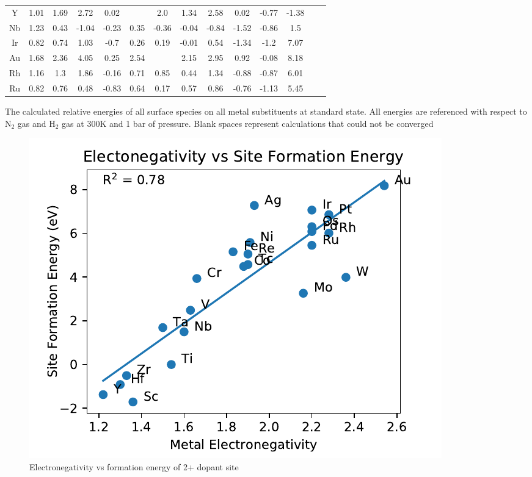 \begin{center}
\begin{tabular}{| c | c | c | c | c | c | c | c | c | c | c | c | c | c |}
Y & 1.01 & 1.69 & 2.72 & 0.02 &  & 2.0 & 1.34 & 2.58 & 0.02 & -0.77 & -1.38 \\
Nb & 1.23 & 0.43 & -1.04 & -0.23 & 0.35 & -0.36 & -0.04 & -0.84 & -1.52 & -0.86 & 1.5 \\
Ir & 0.82 & 0.74 & 1.03 & -0.7 & 0.26 & 0.19 & -0.01 & 0.54 & -1.34 & -1.2 & 7.07 \\
Au & 1.68 & 2.36 & 4.05 & 0.25 & 2.54 &  & 2.15 & 2.95 & 0.92 & -0.08 & 8.18 \\
Rh & 1.16 & 1.3 & 1.86 & -0.16 & 0.71 & 0.85 & 0.44 & 1.34 & -0.88 & -0.87 & 6.01 \\
Ru & 0.82 & 0.76 & 0.48 & -0.83 & 0.64 & 0.17 & 0.57 & 0.86 & -0.76 & -1.13 & 5.45 \\
\hline
\end{tabular}
\caption{The calculated relative energies of all surface species on all metal substituents at standard state. All energies are referenced with respect to N$_2$ gas and H$_2$ gas at 300K and 1 bar of pressure. Blank spaces represent calculations that could not be converged}
\label{table:energies}
\end{center}



\begin{figure}
\centering
\includegraphics[width=0.8\linewidth]{Images/electronegativity_vs_formation.pdf}
\caption{Electronegativity vs formation energy of 2+ dopant site}
\end{figure}

